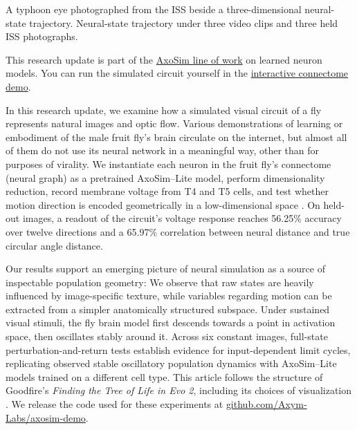 \documentclass[11pt]{article}
\begin{document}

\begin{publicationhead}
\makepublicationtitle
\end{publicationhead}

\ifdefined\HCode
  \ifvmode\IgnorePar\fi\EndP
  \ShowPar
\else
    {A typhoon eye photographed from the ISS beside a three-dimensional neural-state trajectory.}
    {Neural-state trajectory under three video clips and three held ISS photographs.}
\fi

This research update is part of the \href{https://axo.axym.org}{AxoSim line of work} on learned neuron models. You can run the simulated circuit yourself in the \href{https://axym.org/work/axosim-connectome-demo/}{interactive connectome demo}.

In this research update, we examine how a simulated visual circuit of a fly represents natural images and optic flow. Various demonstrations of learning or embodiment of the male fruit fly's brain circulate on the internet, but almost all of them do not use its neural network in a meaningful way, other than for purposes of virality. We instantiate each neuron in the fruit fly's connectome (neural graph) as a pretrained AxoSim--Lite model, perform dimensionality reduction, record membrane voltage from T4 and T5 cells, and test whether motion direction is encoded geometrically in a low-dimensional space \cite{axosim,flyvis}. On held-out images, a readout of the circuit's voltage response reaches 56.25\% accuracy over twelve directions and a 65.97\% correlation between neural distance and true circular angle distance.

Our results support an emerging picture of neural simulation as a source of inspectable population geometry: We observe that raw states are heavily influenced by image-specific texture, while variables regarding motion can be extracted from a simpler anatomically structured subspace. Under sustained visual stimuli, the fly brain model first descends towards a point in activation space, then oscillates stably around it. Across six constant images, full-state perturbation-and-return tests establish evidence for input-dependent limit cycles, replicating observed stable oscillatory population dynamics with AxoSim--Lite models trained on a different cell type. This article follows the structure of Goodfire's \textit{Finding the Tree of Life in Evo 2}, including its choices of visualization \cite{goodfire}. We release the code used for these experiments at \href{https://github.com/Axym-Labs/axosim-demo}{github.com/Axym-Labs/axosim-demo}.
\end{document}
